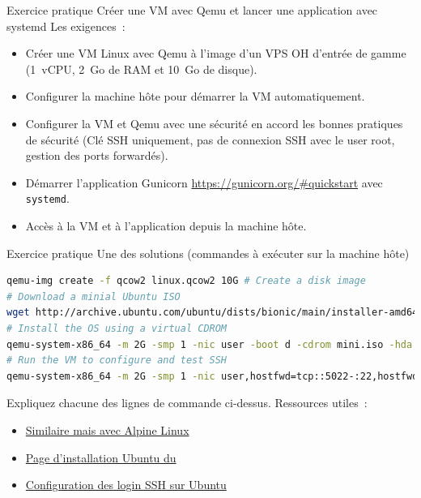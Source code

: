 \documentclass{beamer}
\begin{document}
    \begin{frame}{Exercice pratique \execcounterdispinc{}}{Créer une VM avec Qemu et lancer une application avec systemd}
        Les exigences~:
        \begin{itemize}
            \item Créer une VM Linux avec Qemu à l'image d'un VPS OH d'entrée de gamme (1~vCPU, 2~Go de RAM et 10~Go de disque).
            \item Configurer la machine hôte pour démarrer la VM automatiquement.
            \item Configurer la VM et Qemu avec une sécurité en accord les bonnes pratiques de sécurité (Clé SSH uniquement, pas de connexion SSH avec le user root, gestion des ports forwardés).
            \item Démarrer l'application Gunicorn  \url{https://gunicorn.org/\#quickstart} avec \lstinline{systemd}.
            \item Accès à la VM et à l'application depuis la machine hôte.
        \end{itemize}
    \end{frame}

    \begin{frame}[fragile]{Exercice pratique \execcounterdispinc{}}{Une des solutions (commandes à exécuter sur la machine hôte)}
        \begin{lstlisting}[language=bash]
qemu-img create -f qcow2 linux.qcow2 10G # Create a disk image
# Download a minial Ubuntu ISO
wget http://archive.ubuntu.com/ubuntu/dists/bionic/main/installer-amd64/current/images/netboot/mini.iso
# Install the OS using a virtual CDROM
qemu-system-x86_64 -m 2G -smp 1 -nic user -boot d -cdrom mini.iso -hda linux.qcow2 -k fr -enable-kvm
# Run the VM to configure and test SSH
qemu-system-x86_64 -m 2G -smp 1 -nic user,hostfwd=tcp::5022-:22,hostfwd=tcp::5080-:80 -display none -hda linux.qcow2 -k fr -enable-kvm
        \end{lstlisting}
        Expliquez chacune des lignes de commande ci-dessus.
        \bigbreak
        Ressources utiles~:
        \begin{itemize}
            \item \href{https://wiki.alpinelinux.org/wiki/Install_Alpine_in_QEMU}{Similaire mais avec Alpine Linux}
            \item \href{https://help.ubuntu.com/community/Installation/MinimalCD\#A64-bit_PC_.28amd64.2C_x86_64.29_.28Recommended.29}{Page d'installation Ubuntu du  }
            \item \href{https://phoenixnap.com/kb/generate-setup-ssh-key-ubuntu}{Configuration des login SSH sur Ubuntu}
        \end{itemize}
    \end{frame}
\end{document}
